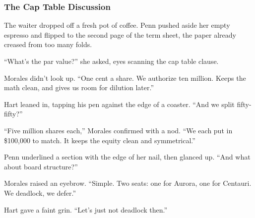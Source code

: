 \medskip

\subsubsection{The Cap Table Discussion}

The waiter dropped off a fresh pot of coffee. Penn pushed aside her empty espresso and flipped to the second page of the 
term sheet, the paper already creased from too many folds.

``What’s the par value?'' she asked, eyes scanning the cap table clause.

Morales didn’t look up. ``One cent a share. We authorize ten million. Keeps the math clean, and gives us room for 
dilution later.''

Hart leaned in, tapping his pen against the edge of a coaster. ``And we split fifty-fifty?''

``Five million shares each,'' Morales confirmed with a nod. ``We each put in \$100,000 to match. It keeps the equity 
clean and symmetrical.''

Penn underlined a section with the edge of her nail, then glanced up. ``And what about board structure?''

Morales raised an eyebrow. ``Simple. Two seats: one for Aurora, one for Centauri. We deadlock, we defer.''

Hart gave a faint grin. ``Let’s just not deadlock then.''

